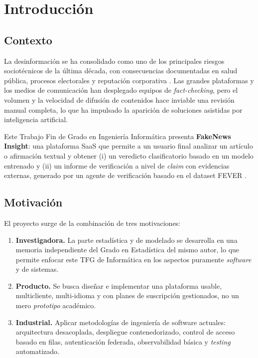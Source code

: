 \chapter{Introducción}\label{cap:introduccion}

\section{Contexto}

La desinformación se ha consolidado como uno de los principales riesgos
sociotécnicos de la última década, con consecuencias documentadas en
salud pública, procesos electorales y reputación corporativa
\cite{lazer2018science,vosoughi2018spread}. Las grandes plataformas y
los medios de comunicación han desplegado equipos de
\emph{fact-checking}, pero el volumen y la velocidad de difusión de
contenidos hace inviable una revisión manual completa, lo que ha
impulsado la aparición de soluciones asistidas por inteligencia
artificial.

Este Trabajo Fin de Grado en Ingeniería Informática presenta
\textbf{FakeNews Insight}: una plataforma SaaS que permite a un usuario
final analizar un artículo o afirmación textual y obtener (i) un
veredicto clasificatorio basado en un modelo entrenado y (ii) un
informe de verificación a nivel de \emph{claim} con evidencias
externas, generado por un agente de verificación basado en el dataset
FEVER \cite{thorne2018fever}.

\section{Motivación}

El proyecto surge de la combinación de tres motivaciones:

\begin{enumerate}[leftmargin=*,itemsep=0.2em]
  \item \textbf{Investigadora.} La parte estadística y de modelado se
        desarrolla en una memoria independiente del Grado en
        Estadística del mismo autor, lo que permite enfocar este TFG
        de Informática en los aspectos puramente \emph{software} y de
        sistemas.
  \item \textbf{Producto.} Se busca diseñar e implementar una
        plataforma usable, multicliente, multi-idioma y con planes de
        suscripción gestionados, no un mero \emph{prototipo}
        académico.
  \item \textbf{Industrial.} Aplicar metodologías de ingeniería de
        software actuales: arquitectura desacoplada, despliegue
        contenedorizado, control de acceso basado en filas, autenticación
        federada, observabilidad básica y \emph{testing} automatizado.
\end{enumerate}


